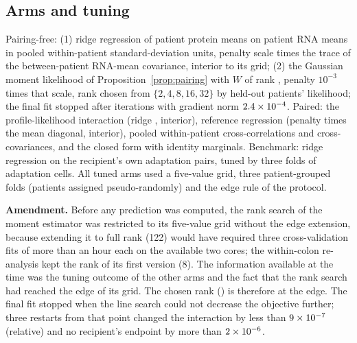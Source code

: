 \subsection*{Arms and tuning}
Pairing-free: (1) ridge regression of patient protein means on patient RNA
means in pooled within-patient standard-deviation units, penalty scale
\XsPfScale{} times the trace of the between-patient RNA-mean covariance,
interior to its grid; (2) the Gaussian moment likelihood of
Proposition~\ref{prop:pairing} with $W$ of rank \XsPfRank{}, penalty $10^{-3}$
times that scale, rank chosen from $\{2,4,8,16,32\}$ by held-out patients'
likelihood; the final fit stopped after \XsPfMomentIter{} iterations with
gradient norm $2.4\times10^{-4}$. Paired: the profile-likelihood interaction
(ridge \XsPairedRidge{}, interior), reference regression (penalty
\XsRegLambda{} times the mean diagonal, interior), pooled within-patient
cross-correlations and cross-covariances, and the closed form with identity
marginals. Benchmark: ridge regression on the recipient's own adaptation
pairs, tuned by three folds of adaptation cells. All tuned arms used a
five-value grid, three patient-grouped folds (patients assigned pseudo-randomly) and the
edge rule of the protocol.

\textbf{Amendment.} Before any prediction was computed, the rank search of
the moment estimator was restricted to its five-value grid without the edge
extension, because extending it to full rank (122) would have required three
cross-validation fits of more than an hour each on the available two cores;
the within-colon re-analysis kept the rank of its first version (8). The
information available at the time was the tuning outcome of the other arms and
the fact that the rank search had reached the edge of its grid. The chosen rank
(\XsPfRank) is therefore at the edge. The final fit stopped when the line
search could not decrease the objective further; three restarts from that point
changed the interaction by less than $9\times10^{-7}$ (relative) and no
recipient's endpoint by more than $2\times10^{-6}$.

